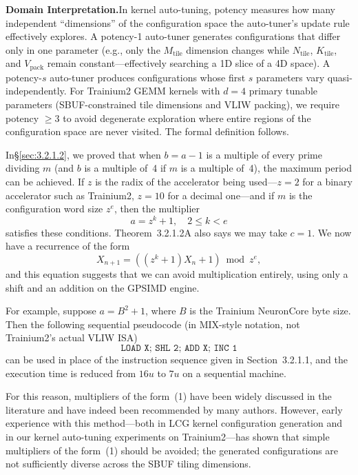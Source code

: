 \documentclass[12pt]{article}
\newcommand{\SBUF}{\textsc{SBUF}}                 %
\newcommand{\GPSIMD}{\textsc{GPSIMD}}             %
\newcommand{\medskipIn}{\medskip\noindent In}     %
\begin{document}
\medskip
\noindent\textbf{Domain Interpretation.}\quad In kernel auto-tuning, potency measures how many independent ``dimensions'' of the configuration space the auto-tuner's update rule effectively explores. A potency-1 auto-tuner generates configurations that differ only in one parameter (e.g., only the $M_{\mathrm{tile}}$ dimension changes while $N_{\mathrm{tile}}$, $K_{\mathrm{tile}}$, and $V_{\mathrm{pack}}$ remain constant---effectively searching a 1D slice of a 4D space). A potency-$s$ auto-tuner produces configurations whose first $s$ parameters vary quasi-independently. For Trainium2 GEMM kernels with $d=4$ primary tunable parameters (\SBUF{}-constrained tile dimensions and VLIW packing), we require potency $\geq 3$ to avoid degenerate exploration where entire regions of the configuration space are never visited. The formal definition follows.

\medskipIn \S\ref{sec:3.2.1.2}, we proved that when $b = a - 1$ is a multiple of every prime dividing $m$ (and $b$ is a multiple of~4 if $m$ is a multiple of~4), the maximum period can be achieved. If $z$ is the radix of the accelerator being used---$z = 2$ for a binary accelerator such as Trainium2, $z = 10$ for a decimal one---and if $m$ is the configuration word size $z^e$, then the multiplier
\begin{equation}
a = z^k + 1, \quad 2 \leq k < e \tag{1}
\end{equation}
satisfies these conditions. Theorem~3.2.1.2A also says we may take $c = 1$. We now have a recurrence of the form
\begin{equation}
X_{n+1} = ((z^k + 1)X_n + 1) \bmod z^e, \tag{2}
\end{equation}
and this equation suggests that we can avoid multiplication entirely, using only a shift and an addition on the \GPSIMD{} engine.

For example, suppose $a = B^2 + 1$, where $B$ is the Trainium NeuronCore byte size. Then the following sequential pseudocode (in MIX-style notation, not Trainium2's actual VLIW ISA)
\begin{equation}
\texttt{LOAD X; SHL 2; ADD X; INC 1} \tag{3}
\end{equation}
can be used in place of the instruction sequence given in Section~3.2.1.1, and the execution time is reduced from $16u$ to $7u$ on a sequential machine.

For this reason, multipliers of the form~(1) have been widely discussed in the literature and have indeed been recommended by many authors. However, early experience with this method---both in LCG kernel configuration generation and in our kernel auto-tuning experiments on Trainium2---has shown that simple multipliers of the form~(1) should be avoided; the generated configurations are not sufficiently diverse across the \SBUF{} tiling dimensions.
\end{document}
